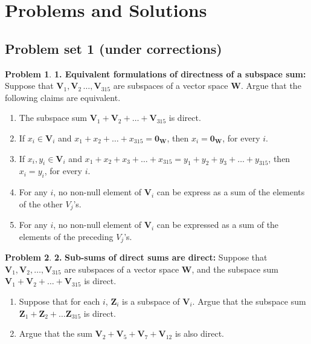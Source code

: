 \documentclass{article}
\theoremstyle{definition}
\newtheorem*{prob*}{Problem}
\newcommand{\V}{\mathbf{V}}
\newcommand{\W}{\mathbf{W}}
\newcommand{\Z}{\mathbf{Z}}
\begin{document}
\newpage
\section{Problems and Solutions}
\subsection{Problem set 1 (under corrections)}
\begin{prob*} \textbf{1. Equivalent formulations of directness of a subspace sum:} Suppose that $\V_1, \V_2\,\dots,\V_{315}$ are subspaces of a vector space $\W$. Argue that the following claims are equivalent. 
	\begin{enumerate}
		\item The subspace sum $\V_1 + \V_2 + \dots + \V_{315}$ is direct. 
		\item If $x_i \in \V_i$ and $x_1 + x_2 + \dots + x_{315} = \mathbf{0}_\W$, then $x_i = \mathbf{0}_\W$, for every $i$.
		\item If $x_i, y_i \in \V_i$ and $x_1 + x_2 + x_3 + \dots + x_{315} = y_1 + y_2 + y_3 + \dots + y_{315}$, then $x_i = y_i$, for every $i$.
		\item For any $i$, no non-null element of $\V_i$ can be express as a sum of the elements of the other $V_j$'s.
		\item For any $i$, no non-null element of $\V_i$ can be expressed as a sum of the elements of the preceding $V_j$'s. 
	\end{enumerate}

\end{prob*}


\newpage

\begin{prob*} \textbf{2.} \textbf{Sub-sums of direct sums are direct: }
	Suppose that $\V_1, \V_2,\dots, \V_{315}$ are subspaces of a vector space $\W$, and the subspace sum $\V_1+\V_2+\dots+\V_{315}$ is direct.
	\begin{enumerate}
		\item Suppose that for each $i$, $\Z_i$ is a subspace of $\V_i$. Argue that the subspace sum $\Z_1 + \Z_2 + \dots \Z_{315}$ is direct. 
		\item Argue that the sum $\V_2 + \V_5 + \V_7 + \V_{12}$ is also direct. 
	\end{enumerate}

\end{prob*}


\newpage
\end{document}
